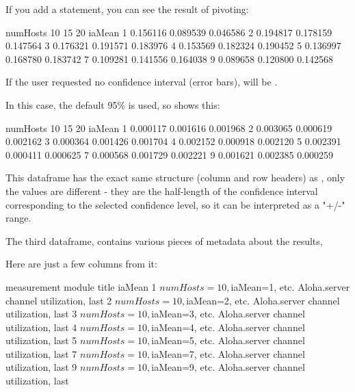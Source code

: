 If you add a  statement, you can see the result of pivoting:

\begin{commandline}
numHosts        10        15        20
iaMean
1         0.156116  0.089539  0.046586
2         0.194817  0.178159  0.147564
3         0.176321  0.191571  0.183976
4         0.153569  0.182324  0.190452
5         0.136997  0.168780  0.183742
7         0.109281  0.141556  0.164038
9         0.089658  0.120800  0.142568
\end{commandline}

If the user requested no confidence interval (error bars),  will be .

In this case, the default 95\% is used, so  shows this:

\begin{commandline}
numHosts        10        15        20
iaMean
1         0.000117  0.001616  0.001968
2         0.003065  0.000619  0.002162
3         0.000364  0.001426  0.001704
4         0.002152  0.000918  0.002120
5         0.002391  0.000411  0.000625
7         0.000568  0.001729  0.002221
9         0.001621  0.002385  0.000259
\end{commandline}

This dataframe has the exact same structure (column and row headers) as ,
only the values are different - they are the half-length of the confidence interval
corresponding to the selected confidence level, so it can be interpreted as a "+/-" range.

The third dataframe,  contains various pieces of metadata about the results,

Here are just a few columns from it:

\begin{commandline}
                        measurement        module                      title
iaMean
1      $numHosts=10, $iaMean=1, etc.  Aloha.server  channel utilization, last
2      $numHosts=10, $iaMean=2, etc.  Aloha.server  channel utilization, last
3      $numHosts=10, $iaMean=3, etc.  Aloha.server  channel utilization, last
4      $numHosts=10, $iaMean=4, etc.  Aloha.server  channel utilization, last
5      $numHosts=10, $iaMean=5, etc.  Aloha.server  channel utilization, last
7      $numHosts=10, $iaMean=7, etc.  Aloha.server  channel utilization, last
9      $numHosts=10, $iaMean=9, etc.  Aloha.server  channel utilization, last
\end{commandline}

